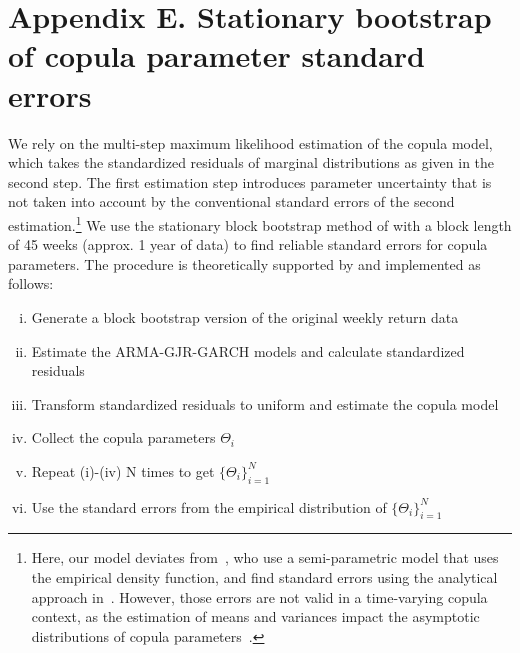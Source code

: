 \newpage

\section{Appendix E. Stationary bootstrap of copula parameter standard errors} \label{App:Appendix_bootstrap}
We rely on the multi-step maximum likelihood estimation of the copula model, which takes the standardized residuals of marginal distributions as given in the second step. The first estimation step introduces parameter uncertainty that is not taken into account by the conventional standard errors of the second estimation.\footnote{Here, our model deviates from~\textcite{ChristoffersenLanglois2013}, who use a semi-parametric model that uses the empirical density function, and find standard errors using the analytical approach in~\textcite{ChenFan2006}. However, those errors are not valid in a time-varying copula context, as the estimation of means and variances impact the asymptotic distributions of copula parameters~\autocite{Remillard2010}.} We use the stationary block bootstrap method of \textcite{PolitisRomano1994} with a block length of 45 weeks (approx. 1 year of data) to find reliable standard errors for copula parameters. The procedure is theoretically supported by \textcite{GonclavesWhite2004} and implemented as follows:
\begin{enumerate}[(i)]
    \item Generate a block bootstrap version of the original weekly return data
    \item Estimate the ARMA-GJR-GARCH models and calculate standardized residuals
    \item Transform standardized residuals to uniform and estimate the copula model
    \item Collect the copula parameters $\Theta_i$
    \item Repeat (i)-(iv) N times to get $\{\Theta_i\}^{N}_{i=1}$
    \item Use the standard errors from the empirical distribution of $\{\Theta_i\}^{N}_{i=1}$
\end{enumerate}

